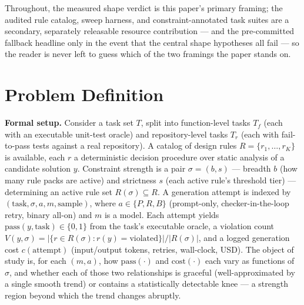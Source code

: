 \documentclass[11pt]{article}
\begin{document}
Throughout, the measured shape verdict is this paper's primary framing; the audited rule catalog, sweep harness, and constraint-annotated task suites are a secondary, separately releasable resource contribution --- and the pre-committed fallback headline only in the event that the central shape hypotheses all fail --- so the reader is never left to guess which of the two framings the paper stands on.

\section{Problem Definition}

\noindent\textbf{Formal setup.} Consider a task set $T$, split into function-level tasks $T_f$ (each with an executable unit-test oracle) and repository-level tasks $T_r$ (each with fail-to-pass tests against a real repository). A catalog of design rules $R = \{r_1,\dots,r_K\}$ is available, each $r$ a deterministic decision procedure over static analysis of a candidate solution $y$. Constraint strength is a pair $\sigma = (b,s)$ --- breadth $b$ (how many rule packs are active) and strictness $s$ (each active rule's threshold tier) --- determining an active rule set $R(\sigma) \subseteq R$. A generation attempt is indexed by $(\text{task}, \sigma, a, m, \text{sample})$, where $a \in \{P, R, B\}$ (prompt-only, checker-in-the-loop retry, binary all-on) and $m$ is a model. Each attempt yields $\text{pass}(y,\text{task}) \in \{0,1\}$ from the task's executable oracle, a violation count $V(y,\sigma) = |\{r \in R(\sigma): r(y) = \text{violated}\}| / |R(\sigma)|$, and a logged generation cost $c(\text{attempt})$ (input/output tokens, retries, wall-clock, USD). The object of study is, for each $(m,a)$, how $\text{pass}(\cdot)$ and $\text{cost}(\cdot)$ each vary as functions of $\sigma$, and whether each of those two relationships is graceful (well-approximated by a single smooth trend) or contains a statistically detectable knee --- a strength region beyond which the trend changes abruptly.
\end{document}
